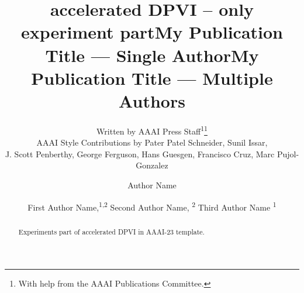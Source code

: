 \documentclass[letterpaper]{article} %
\title{accelerated DPVI -- only experiment part}
\author{
    Written by AAAI Press Staff\textsuperscript{\rm 1}\thanks{With help from the AAAI Publications Committee.}\\
    AAAI Style Contributions by Pater Patel Schneider,
    Sunil Issar,\\
    J. Scott Penberthy,
    George Ferguson,
    Hans Guesgen,
    Francisco Cruz\equalcontrib,
    Marc Pujol-Gonzalez\equalcontrib
}
\title{My Publication Title --- Single Author}
\author {
    Author Name
}
\title{My Publication Title --- Multiple Authors}
\author {
    First Author Name,\textsuperscript{\rm 1,\rm 2}
    Second Author Name, \textsuperscript{\rm 2}
    Third Author Name \textsuperscript{\rm 1}
}
\begin{document}
\maketitle

\begin{abstract}
Experiments part of accelerated DPVI in AAAI-23 template.
\end{abstract}






\end{document}
